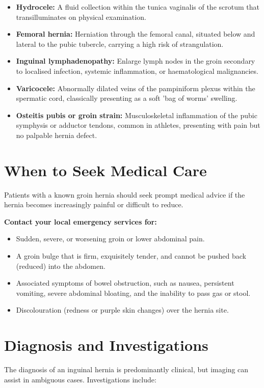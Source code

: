 \begin{itemize}
    \item \textbf{Hydrocele:} A fluid collection within the tunica vaginalis of the scrotum that transilluminates on physical examination.
    \item \textbf{Femoral hernia:} Herniation through the femoral canal, situated below and lateral to the pubic tubercle, carrying a high risk of strangulation.
    \item \textbf{Inguinal lymphadenopathy:} Enlarge lymph nodes in the groin secondary to localised infection, systemic inflammation, or haematological malignancies.
    \item \textbf{Varicocele:} Abnormally dilated veins of the pampiniform plexus within the spermatic cord, classically presenting as a soft 'bag of worms' swelling.
    \item \textbf{Osteitis pubis or groin strain:} Musculoskeletal inflammation of the pubic symphysis or adductor tendons, common in athletes, presenting with pain but no palpable hernia defect.
\end{itemize}

\section*{When to Seek Medical Care}
Patients with a known groin hernia should seek prompt medical advice if the hernia becomes increasingly painful or difficult to reduce.

\textbf{Contact your local emergency services for:}
\begin{itemize}
    \item Sudden, severe, or worsening groin or lower abdominal pain.
    \item A groin bulge that is firm, exquisitely tender, and cannot be pushed back (reduced) into the abdomen.
    \item Associated symptoms of bowel obstruction, such as nausea, persistent vomiting, severe abdominal bloating, and the inability to pass gas or stool.
    \item Discolouration (redness or purple skin changes) over the hernia site.
\end{itemize}

\section*{Diagnosis and Investigations}
The diagnosis of an inguinal hernia is predominantly clinical, but imaging can assist in ambiguous cases. Investigations include:


